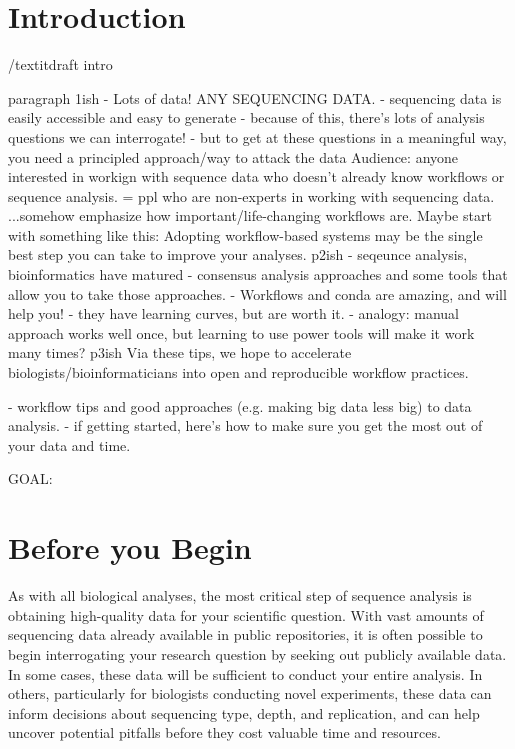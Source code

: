 \documentclass[10pt,letterpaper]{article}
\begin{document}
\linenumbers

\section*{Introduction}

/textit{draft intro}

paragraph 1ish
- Lots of data! ANY SEQUENCING DATA.
- sequencing data is easily accessible and easy to generate
- because of this, there's lots of analysis questions we can interrogate!
- but to get at these questions in a meaningful way, you need a principled approach/way to attack the data
Audience: anyone interested in workign with sequence data who doesn't already know workflows or sequence analysis. 
 = ppl who are non-experts in working with sequencing data.
...somehow emphasize how important/life-changing workflows are. Maybe start with something like this: Adopting workflow-based systems may be the single best step you can take to improve your analyses. %
p2ish
- seqeunce analysis, bioinformatics have matured - consensus analysis approaches and some tools that allow you to take those approaches.
- Workflows and conda are amazing, and will help you!
- they have learning curves, but are worth it.
- analogy: manual approach works well once, but learning to use power tools will make it work many times?
p3ish
Via these tips, we hope to accelerate biologists/bioinformaticians into open and reproducible workflow practices.

- workflow tips and good approaches (e.g. making big data less big) to data analysis.
- if getting started, here's how to make sure you get the most out of your data and time.

GOAL: 


\section*{Before you Begin}

As with all biological analyses, the most critical step of sequence analysis is obtaining high-quality data for your scientific question. 
With vast amounts of sequencing data already available in public repositories, it is often possible to begin interrogating your research question by seeking out publicly available data. 
In some cases, these data will be sufficient to conduct your entire analysis. 
In others, particularly for biologists conducting novel experiments, these data can inform decisions about sequencing type, depth, and replication, and can help uncover potential pitfalls before they cost valuable time and resources.
\end{document}
